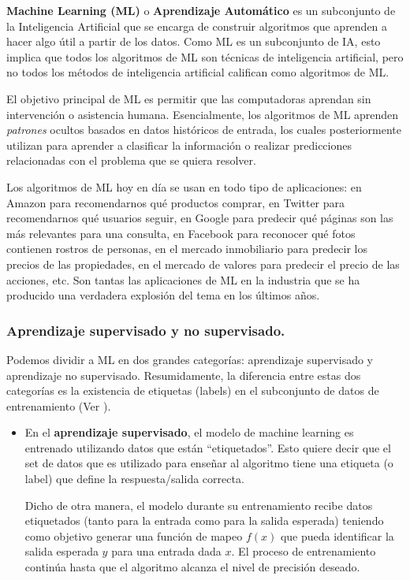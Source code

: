 \documentclass[12pt,a4paper]{article}
\begin{document}
\begin{sloppypar}
\textbf{Machine Learning (ML)} o \textbf{Aprendizaje Automático} es un subconjunto de la Inteligencia Artificial que se encarga de construir algoritmos que aprenden a hacer algo útil a partir de los datos. 
Como ML es un subconjunto de IA, esto implica que todos los algoritmos de ML son técnicas de inteligencia artificial, pero no todos los métodos de inteligencia artificial califican como algoritmos de ML.

El objetivo principal de ML es permitir que las computadoras aprendan sin intervención o asistencia humana.
Esencialmente, los algoritmos de ML aprenden \textit{patrones} ocultos basados en datos históricos de entrada, los cuales posteriormente utilizan para aprender a clasificar la información o realizar predicciones relacionadas con el problema que se quiera resolver. 

Los algoritmos de ML hoy en día se usan en todo tipo de aplicaciones: en Amazon para recomendarnos qué productos comprar, en Twitter para recomendarnos qué usuarios seguir, en Google para predecir qué páginas son las más relevantes para una consulta, en Facebook para reconocer qué fotos contienen rostros de personas, en el mercado inmobiliario para predecir los precios de las propiedades, en el mercado de valores para predecir el precio de las acciones, etc. Son tantas las aplicaciones de ML en la industria que se ha producido una verdadera explosión del tema en los últimos años\cite{apunte_uba}.

\cleardoublepage
\subsubsection{Aprendizaje supervisado y no supervisado.}

Podemos dividir a ML en dos grandes categorías: aprendizaje supervisado y aprendizaje no supervisado. Resumidamente, la diferencia entre estas dos categorías es la existencia de etiquetas (labels) en el subconjunto de datos de entrenamiento (Ver \textit{}).

\begin{itemize}
\item En el \textbf{aprendizaje supervisado}\cite{intro_clasificacion_ML}, el modelo de machine learning es entrenado utilizando datos que están “etiquetados”. Esto quiere decir que el set de datos que es utilizado para enseñar al algoritmo tiene una etiqueta (o label) que define la respuesta/salida correcta. 

Dicho de otra manera, el modelo durante su entrenamiento recibe datos etiquetados (tanto para la entrada como para la salida esperada) teniendo como objetivo generar una función de mapeo $f(x)$ que pueda identificar la salida esperada $y$ para una entrada dada $x$. El proceso de entrenamiento continúa hasta que el algoritmo alcanza el nivel de precisión deseado. 


\end{itemize}
\end{sloppypar}
\end{document}
